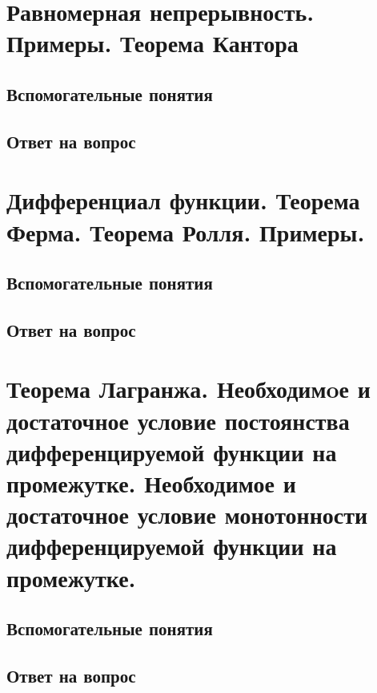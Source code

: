 \documentclass[12pt,a4paper]{article}
\begin{document}
\tableofcontents
\newpage

\section{Равномерная непрерывность. Примеры. Теорема Кантора}

\subsection*{Вспомогательные понятия}


\subsection*{Ответ на вопрос}



\newpage
\section{Дифференциал функции. Теорема Ферма. Теорема Ролля. Примеры.}

\subsection*{Вспомогательные понятия}


\subsection*{Ответ на вопрос}



\newpage
\section{Теорема Лагранжа. Необходимoе и достаточное условие постоянства дифференцируемой функции на промежутке. Необходимое и достаточное условие монотонности дифференцируемой функции на промежутке.}

\subsection*{Вспомогательные понятия}


\subsection*{Ответ на вопрос}

\end{document}
